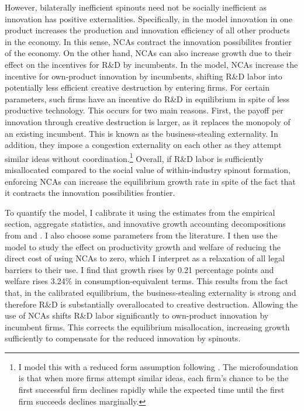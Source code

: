 \documentclass[ecta,nameyear,final]{econsocart}
\theoremstyle{plain}
\theoremstyle{remark}
\begin{document}
However, bilaterally inefficient spinouts need not be socially inefficient as innovation has positive externalities. Specifically, in the model innovation in one product increases the production and innovation efficiency of all other products in the economy. In this sense, NCAs contract the innovation possibilites frontier of the economy. On the other hand, NCAs can also increase growth due to their effect on the incentives for R\&D by incumbents. In the model, NCAs increase the incentive for own-product innovation by incumbents, shifting R\&D labor into potentially less efficient creative destruction by entering firms. For certain parameters, such firms have an incentive do R\&D in equilibrium in spite of less productive technology. This occurs for two main reasons. First, the payoff per innovation through creative destruction is larger, as it replaces the monopoly of an existing incumbent. This is known as the business-stealing externality. In addition, they impose a congestion externality on each other as they attempt similar ideas without coordination.\footnote{I model this with a reduced form assumption following \cite{acemoglu_innovation_2015}. The microfoundation is that when more firms attempt similar ideas, each firm's chance to be the first successful firm declines rapidly while the expected time until the first firm succeeds declines marginally.} Overall, if R\&D labor is sufficiently misallocated compared to the social value of within-industry spinout formation, enforcing NCAs can increase the equilibrium growth rate in spite of the fact that it contracts the innovation possibilities frontier.

To quantify the model, I calibrate it using the estimates from the empirical section, aggregate statistics, and innovative growth accounting decompositions from \cite{garcia-macia_how_2019} and \cite{klenow_innovative_2020}. I also choose some parameters from the literature. I then use the model to study the effect on productivity growth and welfare of reducing the direct cost of using NCAs to zero, which I interpret as a relaxation of all legal barriers to their use. I find that growth rises by 0.21 percentage points and welfare rises 3.24\% in consumption-equivalent terms. This results from the fact that, in the calibrated equilibrium, the business-stealing externality is strong and therefore R\&D is substantially overallocated to creative destruction. Allowing the use of NCAs shifts R\&D labor significantly to own-product innovation by incumbent firms. This corrects the equilibrium misallocation, increasing growth sufficiently to compensate for the reduced innovation by spinouts.
\end{document}
